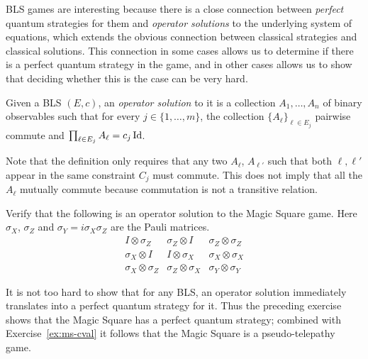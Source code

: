 BLS games are interesting because there is a close connection between \emph{perfect} quantum strategies for them and \emph{operator solutions} to the underlying system of equations, which extends the obvious connection between classical strategies and classical solutions. This connection in some cases allows us to determine if there is a perfect quantum strategy in the game, and in other cases allows us to show that deciding whether this is the case can be very hard. 

\begin{definition}
Given a BLS $(E,c)$, an \emph{operator solution} to it is a collection $A_1,\ldots,A_n$ of binary observables such that for every $j\in\{1,\ldots,m\}$, the collection $\{A_\ell\}_{\ell\in E_j}$ pairwise commute and $\prod_{\ell\in E_j} A_{\ell} = c_j \mathop{\rm Id}\nolimits$. 
\end{definition}

Note that the definition only requires that any two $A_\ell$, $A_{\ell'}$ such that both $\ell,\ell'$ appear in the same constraint $C_j$ must commute. This does not imply that all the $A_\ell$ mutually commute because commutation is not a transitive relation. 

\begin{exercise}
Verify that the following is an operator solution to the Magic Square game. Here $\sigma_X$, $\sigma_Z$ and $\sigma_Y = i\sigma_X\sigma_Z$ are the Pauli matrices. 
\begin{equation}\label{eq:opsol-ms}
 \begin{matrix} I\otimes \sigma_Z & \sigma_Z \otimes I & \sigma_Z \otimes \sigma_Z \\
\sigma_X \otimes I & I \otimes \sigma_X & \sigma_X\otimes \sigma_X\\
\sigma_X \otimes \sigma_Z & \sigma_Z \otimes \sigma_X & \sigma_Y \otimes \sigma_Y 
\end{matrix}
\end{equation}
\end{exercise}

It is not too hard to show that for any BLS, an operator solution immediately translates into a perfect quantum strategy for it. Thus the preceding exercise shows that the Magic Square has a perfect quantum strategy; combined with Exercise~\ref{ex:ms-cval} it follows that the Magic Square is a pseudo-telepathy game.  

